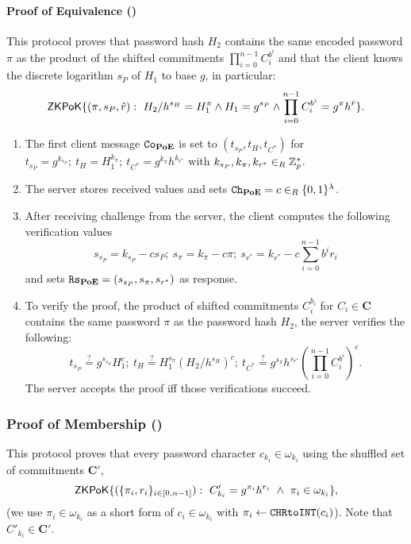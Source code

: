 \paragraph{Proof of Equivalence (\PoE)}
This protocol proves that password hash $H_2$ contains the same encoded password $\pi$ as the product of the shifted commitments $\prod_{i=0}^{n-1} C^{b^i}_i$ and that the client knows the discrete logarithm $s_P$ of $H_1$ to base $g$, in particular:
\[
  \mathsf{ZKPoK}\{(\pi,s_P,\hat{r}) : ~ H_2/h^{s_H}=H_1^{\pi} \wedge H_1 = g^{s_P} \wedge \prod_{i=0}^{n-1} C_i^{b^i} = g^{\pi}h^{\hat{r}}\}.
\]
\begin{enumerate}
  \item The first client message $\mathtt{Co}_\mathsf{\bf PoE}$ is set to $(t_{s_P}, t_H, t_{C^\ast})$ for
    $t_{s_P}=g^{k_{s_P}};~ t_H=H_1^{k_{\pi}};~ t_{C^\ast}=g^{k_{\pi}}h^{k_{r^{\ast}}}$
    with 
    $k_{s_P},k_{\pi},k_{r^\ast}\in_R\mathbb{Z}^\ast_p$.
    
  \item The server stores received values and sets $\mathtt{Ch}_\mathsf{\bf PoE}=c\in_R\{0,1\}^\lambda$. 
  
  \item After receiving challenge \Client from the server, the client computes the following verification values
    \[
      s_{s_P}=k_{s_P}-c s_P;~ s_{\pi}=k_\pi - c \pi;~ s_{r^\ast}=k_{r^\ast} - c \sum_{i=0}^{n-1} b^i r_i
    \]
    and sets $\mathtt{Rs}_\mathsf{\bf PoE}=(s_{s_P}, s_\pi, s_{r^\ast})$ as response.
  
  \item To verify the proof, \ie the product of shifted commitments $C_i^{b_i}$ for $C_i\in\bm C$ contains the same password $\pi$ as the password hash $H_2$, the server verifies the following:
    \[
      t_{s_P}\stackrel{?}{=}g^{s_{s_P}}H_1^{c};~ t_H\stackrel{?}{=}H_1^{s_\pi}(H_2/h^{s_H})^c;~
      t_{C^\ast}\stackrel{?}{=}g^{s_\pi}h^{s_{r^\ast}} \left(\prod_{i=0}^{n-1} C^{b^i}_i \right)^c.
    \]
    The server accepts the proof iff those verifications succeed.
\end{enumerate}


\subsubsection{Proof of Membership (\PoM)}
This protocol proves that every password character $c_{k_i}\in\omega_{k_i}$ using the shuffled set of commitments $\bm C'$, \ie
\[\mathsf{ZKPoK}\{(\{\pi_i,r_i\}_{i\in[0,n-1]}) : ~ C'_{{k_i}}=g^{\pi_{i}}h^{r_{i}} ~ \wedge ~ \pi_{i}\in \omega_{{k_i}}\},\]
(we use $\pi_{i}\in \omega_{{k_i}}$ as a short form of $c_i\in\omega_{{k_i}}$ with $\pi_i\gets \texttt{CHRtoINT}(c_i)$).
Note that $C'_{k_i}\in \bm C'$.

